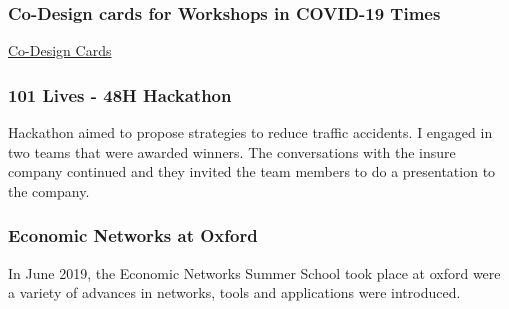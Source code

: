 \subsubsection{Co-Design cards for Workshops in COVID-19 Times}

\href{https://chalmers.shinyapps.io/Goteborg_historical/?_ga=2.267750478.1104859035.1597823961-1745043960.1597823961}{Co-Design Cards}

\subsubsection{101 Lives - 48H Hackathon}
Hackathon aimed to propose strategies to reduce traffic accidents. I engaged in two teams that were awarded winners. The conversations with the insure company continued and they invited the team members to do a presentation to the company. 

\subsubsection{Economic Networks at Oxford}
In June 2019, the Economic Networks Summer School took place at oxford were a variety of advances in networks, tools and applications were introduced. 